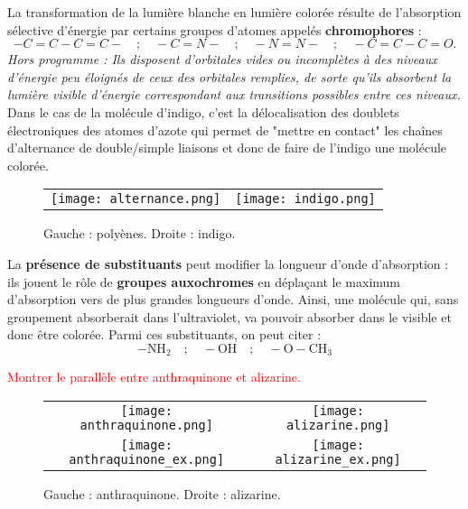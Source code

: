 \documentclass[11pt,a4paper]{report}
\begin{document}
La transformation de la lumière blanche en lumière colorée résulte de l'absorption sélective d'énergie par certains groupes d'atomes appelés \textbf{chromophores} :
\begin{equation}
	-C = C - C = C - \quad;\quad - C = N - \quad;\quad  -N = N- \quad;\quad  -C = C - C = O.
\end{equation}
\textit{Hors programme : Ils disposent d'orbitales vides ou incomplètes à des niveaux d'énergie peu éloignés de ceux des orbitales remplies, de sorte qu'ils absorbent la lumière visible d'énergie correspondant aux transitions possibles entre ces niveaux.}\\ 

Dans le cas de la molécule d'indigo, c'est la délocalisation des doublets électroniques des atomes d'azote qui permet de "mettre en contact" les chaînes d'alternance de double/simple liaisons et donc de faire de l'indigo une molécule colorée.\\

\begin{figure}[h!]
	\begin{center}
		\begin{tabular}{cc}
  		\texttt{[image: alternance.png]} &
   		\texttt{[image: indigo.png]}\\
	\end{tabular}
	\caption{Gauche : polyènes. Droite : indigo.}
	\end{center}
\end{figure}

La \textbf{présence de substituants} peut modifier la longueur d'onde d'absorption : ils jouent le rôle de \textbf{groupes auxochromes} en déplaçant le maximum d'absorption vers de plus grandes longueurs d'onde. Ainsi, une molécule qui, sans groupement absorberait dans l'ultraviolet, va pouvoir absorber dans le visible et donc être colorée. Parmi ces
substituants, on peut citer :
\begin{equation}
		- \text{NH}_2 \quad;\quad -\text{OH} \quad;\quad -\text{O}-\text{CH}_3
\end{equation}

\textcolor{red}{Montrer le parallèle entre anthraquinone et alizarine.}
\begin{figure}[h!]
	\begin{center}
		\begin{tabular}{cc}
  		\texttt{[image: anthraquinone.png]} &
   		\texttt{[image: alizarine.png]}\\
   		\texttt{[image: anthraquinone\_ex.png]} &
   		\texttt{[image: alizarine\_ex.png]}\\
	\end{tabular}
	\caption{Gauche : anthraquinone. Droite : alizarine.}
	\end{center}
\end{figure}
\end{document}
